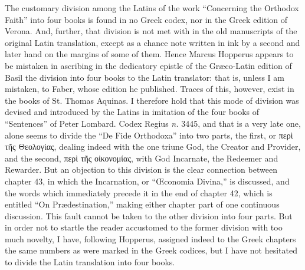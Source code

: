 The customary division among the Latins of the work “Concerning the Orthodox Faith” into four books is found in no Greek codex, nor in the Greek edition of Verona. And, further, that division is not met with in the old manuscripts of the original Latin translation, except as a chance note written in ink by a second and later hand on the margins of some of them. Hence Marcus Hopperus appears to be mistaken in ascribing in the dedicatory epistle of the Græco-Latin edition of Basil the division into four books to the Latin translator: that is, unless I am mistaken, to Faber, whose edition he published. Traces of this, however, exist in the books of St. Thomas Aquinas. I therefore hold that this mode of division was devised and introduced by the Latins in imitation of the four books of “Sentences” of Peter Lombard. Codex Regius \emph{n. }3445, and that is a very late one, alone seems to divide the “De Fide Orthodoxa” into two parts, the first, or \textgreek{περὶ τῆς Θεολογίας}, dealing indeed with the one triune God, the Creator and Provider, and the second, \textgreek{περὶ τῆς οἰκονομίας}, with God Incarnate, the Redeemer and Rewarder. But an objection to this division is the clear connection between chapter 43, in which the Incarnation, or “Œconomia Divina,” is discussed, and the words which immediately precede it in the end of chapter 42, which is entitled “On Prædestination,” making either chapter part of one continuous discussion. This fault cannot be taken to the other division into four parts. But in order not to startle the reader accustomed to the former division with too much novelty, I have, following Hopperus, assigned indeed to the Greek chapters the same numbers as were marked in the Greek codices, but I have not hesitated to divide the Latin translation into four books.

